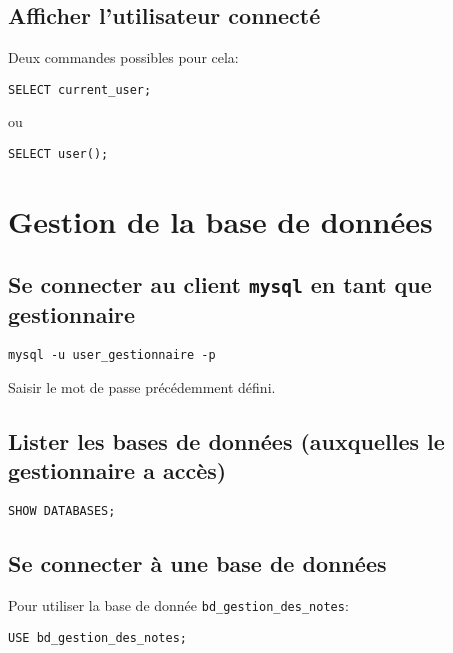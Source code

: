 \documentclass[11pt]{article}
\begin{document}
\subsection{Afficher l'utilisateur connecté}
\label{sec:org3d8569a}

Deux commandes possibles pour cela:
\begin{verbatim}
SELECT current_user;
\end{verbatim}

ou 

\begin{verbatim}
SELECT user();
\end{verbatim}


\section{Gestion de la base de données}
\label{sec:org1bb31c6}

\subsection{Se connecter au client \texttt{mysql} en tant que gestionnaire}
\label{sec:org861a13c}

\begin{verbatim}
mysql -u user_gestionnaire -p
\end{verbatim}

Saisir le mot de passe précédemment défini. 


\subsection{Lister les bases de données (auxquelles le gestionnaire a accès)}
\label{sec:org357520e}

\begin{verbatim}
SHOW DATABASES;
\end{verbatim}

\subsection{Se connecter à une base de données}
\label{sec:orgd1ecede}
Pour utiliser la base de donnée \texttt{bd\_gestion\_des\_notes}:

\begin{verbatim}
USE bd_gestion_des_notes;      
\end{verbatim}
\end{document}
